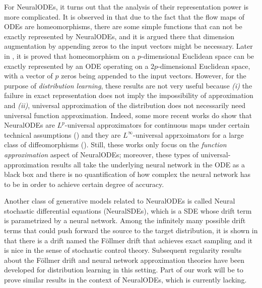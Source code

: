 For NeuralODEs, it turns out that the analysis of their representation
power is more complicated. It is observed in \cite{Augmented} that due
to the fact that the flow maps of ODEs are homeomorphisms, there are
some simple functions that can not be exactly represented by
NeuralODEs, and it is argued there that dimension augmentation by
appending zeros to the input vectors might be necessary. Later in
\cite{ApproximationCapability}, it is proved that homeomorphism on a
$p$-dimensional Euclidean space can be exactly represented by an ODE
operating on a $2p$-dimensional Euclidean space, with a vector of $p$
zeros being appended to the input vectors. However, for the purpose of
\textit{distribution learning}, these results are not very useful
because \textit{(i)} the failure in exact representation does not
imply the impossibility of approximation and \textit{(ii)}, universal
approximation of the distribution does not necessarily need universal
function approximation. Indeed, some more recent works do show that
NeuralODEs are $L^p$-universal approximators for continuous maps under
certain technical assumptions (\cite{DynamicalSystem}) and they are
$L^\infty$-universal apprxoimators for a large class of
diffeomorphisms (\cite{SupApproximation}). Still, these works only
focus on the \textit{function approximation} aspect of NeuralODEs;
moreover, these types of universal-approximation results all take the
underlying neural network in the ODE as a black box and there is no
quantification of how complex the neural network has to be in order to
achieve certain degree of accuracy.

Another class of generative models related to NeuralODEs is called
Neural stochastic differential equations (NeuralSDEs), which is a SDE
whose drift term is parametrized by a neural network. Among the
infinitely many possible drift terms that could push forward the
source to the target distribution, it is shown in \cite{NeuralSDE}
that there is a drift named the F\"ollmer drift that achieves exact
sampling and it is nice in the sense of stochastic control
theory. Subsequent regularity results about the F\"ollmer drift and
neural network approximation theories have been developed for
distribution learning in this setting. Part of our work will be to
prove similar results in the context of NeuralODEs, which is currently
lacking.

